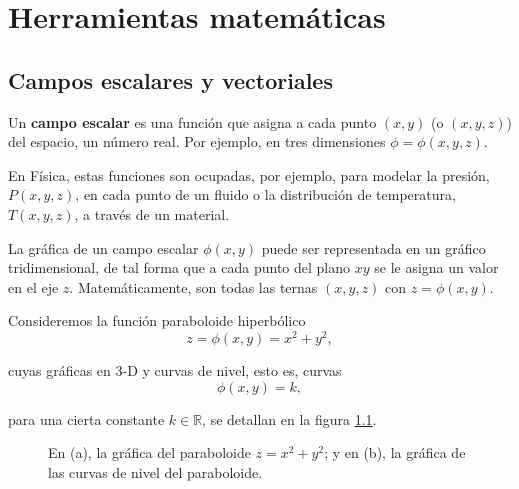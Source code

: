 \chapter{Herramientas matemáticas}

\section{Campos escalares y vectoriales }

Un \textbf{campo escalar} es una función que asigna a cada punto $(x,y)$ (o $(x,y,z)$) del espacio, un número real. Por ejemplo, en tres dimensiones $\phi = \phi(x,y,z)$. 

En Física, estas funciones son ocupadas, por ejemplo, para modelar la presión, $P(x,y,z)$, en cada punto de un fluido o la distribución de temperatura, $T(x,y,z)$, a través de un material. 

La gráfica de un campo escalar $\phi(x,y)$ puede ser representada en un gráfico tridimensional, de tal forma que a cada punto del plano $xy$ se le asigna un valor en el eje $z$. Matemáticamente, son todas las ternas $(x,y,z)$ con $z = \phi(x,y)$. 

\begin{ejemplo}
    Consideremos la función paraboloide hiperbólico
    $$z = \phi(x,y) = x^2+y^2,$$

    cuyas gráficas en 3-D y curvas de nivel, esto es, curvas
    $$\phi(x,y) = k,$$

    para una cierta constante $k \in \mathbb{R}$, se 
    detallan en la figura \ref{fig:CampoEscalar}.

    \begin{figure}[H]
        \centering
         \hspace{1cm}
        \caption{En (a), la gráfica del paraboloide $z = x^2+y^2$; y en (b), la gráfica de las curvas de nivel del paraboloide.}
        \label{fig:CampoEscalar}
    \end{figure}
\end{ejemplo}

